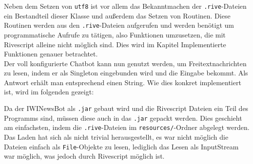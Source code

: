Neben dem Setzen von \texttt{utf8} ist vor allem das Bekanntmachen der \texttt{.rive}-Dateien ein Bestandteil dieser Klasse und außerdem das Setzen von Routinen. Diese Routinen werden aus den \texttt{.rive}-Dateien aufgerufen und werden benötigt um programmatische Aufrufe zu tätigen, also Funktionen umzusetzen, die mit Rivescript alleine nicht möglich sind. Dies wird im Kapitel Implementierte Funktionen genauer betrachtet. \\
Der voll konfigurierte Chatbot kann nun genutzt werden, um Freitextnachrichten zu lesen, indem er als Singleton eingebunden wird und die Eingabe bekommt. Als Antwort erhält man entsprechend einen String. Wie dies konkret implementiert ist, wird im folgenden gezeigt:


Da der IWINewsBot als \texttt{.jar} gebaut wird und die Rivescript Dateien ein Teil des Programms sind, müssen diese auch in das \texttt{.jar} gepackt werden. Dies geschieht am einfachsten, indem die \texttt{.rive}-Dateien im \texttt{resources/}-Ordner abgelegt werden. \\
Das Laden hat sich als nicht trivial herausgestellt, es war nicht möglich die Dateien einfach als \texttt{File}-Objekte zu lesen, lediglich das Lesen als InputStream war möglich, was jedoch durch Rivescript möglich ist.